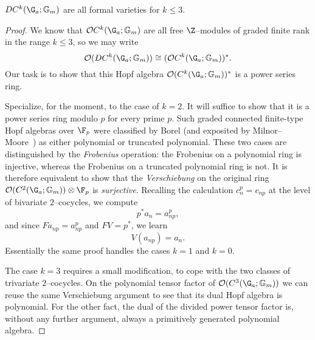 \begin{lemma}\label{CkGaGmAreFVars}
$DC^k(\G_a; \Gm)$ are all formal varieties for $k \le 3$.
\end{lemma}
\begin{proof}
We know that $\sheaf O C^k(\G_a; \Gm)$ are all free $\Z$--modules of graded finite rank in the range $k \le 3$, so we may write \[\sheaf O(D C^k(\G_a; \Gm)) \cong (\sheaf O C^k(\G_a; \Gm))^*.\]  Our task is to show that this Hopf algebra $\sheaf O(C^k(\G_a; \Gm))^*$ is a power series ring.

Specialize, for the moment, to the case of $k = 2$.  It will suffice to show that it is a power series ring modulo $p$ for every prime $p$.  Such graded connected finite-type Hopf algebras over $\F_p$ were classified by Borel (and exposited by Milnor--Moore~\cite[Theorem 7.11]{MilnorMoore}) as either polynomial or truncated polynomial.  These two cases are distinguished by the \textit{Frobenius} operation: the Frobenius on a polynomial ring is injective, whereas the Frobenius on a truncated polynomial ring is not.  It is therefore equivalent to show that the \emph{Verschiebung} on the original ring $\sheaf O(C^2(\G_a; \Gm)) \otimes \F_p$ is \emph{surjective}.  Recalling the calculation $c_n^p = c_{np}$ at the level of bivariate $2$--cocycles, we compute \[p^* a_n = a_{np}^p,\] and since $F a_{np} = a_{np}^p$ and $FV = p^*$, we learn \[V(a_{np}) = a_n.\]  Essentially the same proof handles the cases $k = 1$ and $k = 0$.

The case $k = 3$ requires a small modification, to cope with the two classes of trivariate $2$--cocycles.  On the polynomial tensor factor of $\sheaf O(C^3(\G_a; \Gm))$ we can reuse the same Verschiebung argument to see that its dual Hopf algebra is polynomial.  For the other fact, the dual of the divided power tensor factor is, without any further argument, always a primitively generated polynomial algebra.
\end{proof}


